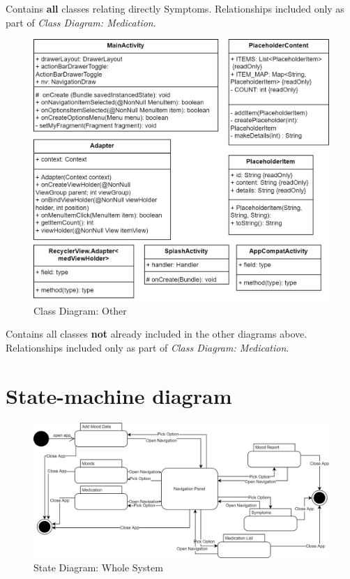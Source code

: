 \documentclass[11pt]{article}
\begin{document}
    Contains \textbf{all} classes relating directly Symptoms.
    Relationships included only as part of \textit{Class Diagram: Medication}.

    \begin{figure}[H]
        \centering
        \includegraphics[width=\textwidth]{Diagrams/Class Diagrams/Class Diagram-Other Classes}
        \caption{Class Diagram: Other}
        \label{fig:figure4}
    \end{figure}

    Contains all classes \textbf{not} already included in the other diagrams above.
    Relationships included only as part of \textit{Class Diagram: Medication}.
    \pagebreak


    \section{State-machine diagram}\label{sec:state-machine-diagram}

    \begin{figure}[H]
        \centering
        \includegraphics[width=\textwidth]{Diagrams/State Diagram/State Diagram}
        \caption{State Diagram: Whole System}
        \label{fig:figure5}
    \end{figure}
\end{document}
